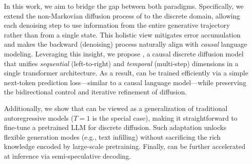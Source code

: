 In this work, we aim to bridge the gap between both paradigms. Specifically, we extend the non-Markovian diffusion process of \citet{DART} to the discrete domain, allowing each denoising step to use information from the entire generative trajectory rather than from a single state. This holistic view mitigates error accumulation and makes the backward (denoising) process naturally align with \textit{causal} language modeling. Leveraging this insight, we propose \method{}, a causal discrete diffusion model that unifies \textit{sequential} (left-to-right) and \textit{temporal} (multi-step) dimensions in a single transformer architecture. As a result, \method{} can be trained efficiently via a simple next-token prediction loss—similar to a causal language model—while preserving the bidirectional control and iterative refinement of diffusion. 

Additionally, we show that \method{} can be viewed as a generalization of traditional autoregressive models ($T=1$ is the special case), making it straightforward to fine-tune a pretrained LLM for discrete diffusion. Such adaptation unlocks flexible generation modes (e.g., text infilling) without sacrificing the rich knowledge encoded by large-scale pretraining. Finally, \method{} can be further accelerated at inference via semi-speculative decoding.



